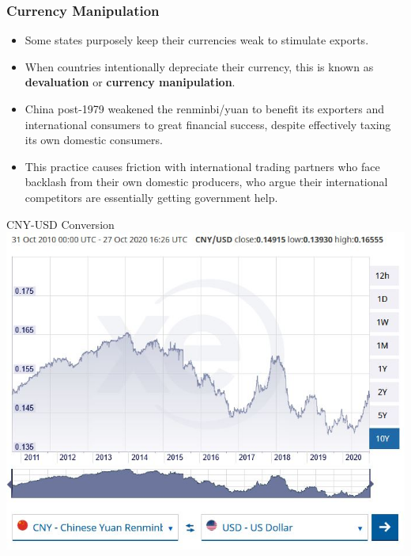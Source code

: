 \documentclass{beamer}
\begin{document}
\begin{frame} 
	\frametitle{\LARGE{Currency Manipulation}}
	\begin{itemize}
			\item Some states purposely keep their currencies weak to stimulate exports. \pause
			\item When countries intentionally depreciate their currency, this is known as \textbf{devaluation} or \textbf{currency manipulation}. \pause 
			\item China post-1979 weakened the renminbi/yuan to benefit its exporters and international consumers to great financial success, despite effectively taxing its own domestic consumers.  \pause
			\item This practice causes friction with international trading partners who face backlash from their own domestic producers, who argue their international competitors are essentially getting government help. 
	\end{itemize}
\end{frame}

\begin{frame}{\LARGE CNY-USD Conversion}
	\centering
	\includegraphics[width=\textwidth,height=0.8\textheight,keepaspectratio]{USD to CNY conversion.JPG}
\end{frame}
\end{document}
